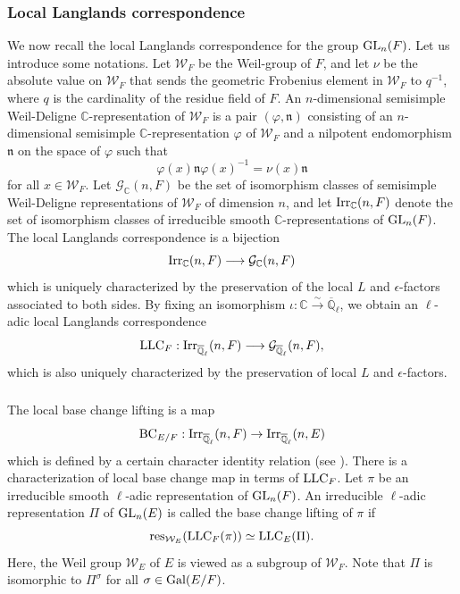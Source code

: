 \documentclass[10pt, reqno]{amsart}
\theoremstyle{plain}
\numberwithin{equation}{section}
\begin{document}
\subsubsection{Local Langlands correspondence}
We now recall the local Langlands correspondence for the group ${\rm GL}_n(F)$. Let us introduce some notations. Let $\mathcal{W}_F$ be the Weil-group of $F$, and let $\nu$ be the absolute value on $\mathcal{W}_F$ that sends the geometric Frobenius element in $\mathcal{W}_F$ to $q^{-1}$, where $q$ is the cardinality of the residue field of $F$. An $n$-dimensional semisimple Weil-Deligne $\mathbb{C}$-representation of $\mathcal{W}_F$ is a pair $(\varphi,\mathfrak{n})$ consisting of an $n$-dimensional semisimple $\mathbb{C}$-representation $\varphi$ of $\mathcal{W}_F$ and a nilpotent endomorphism $\mathfrak{n}$ on the space of $\varphi$ such that 
$$ \varphi(x)\mathfrak{n}\varphi(x)^{-1} = \nu(x)\mathfrak{n} $$
for all $x\in\mathcal{W}_F$. Let $\mathcal{G}_\mathbb{C}(n,F)$ be the set of isomorphism classes of semisimple Weil-Deligne representations of $\mathcal{W}_F$ of dimension $n$, and let ${\rm Irr}_{\mathbb{C}}(n,F)$ denote the set of isomorphism classes of irreducible smooth $\mathbb{C}$-representations of ${\rm GL}_n(F)$. The local Langlands correspondence is a bijection
$$ {\rm Irr}_{\mathbb{C}}(n,F)\longrightarrow \mathcal{G}_{\mathbb{C}}(n,F) $$
which is uniquely characterized by the preservation of the local $L$ and $\epsilon$-factors associated to both sides. By fixing an isomorphism $\iota:\mathbb{C}\xrightarrow{\sim}\overline{\mathbb{Q}}_\ell$, we obtain an $\ell$-adic local Langlands correspondence 
$$ {\rm LLC}_F : {\rm Irr}_{\overline{\mathbb{Q}}_\ell}(n,F)\longrightarrow\mathcal{G}_{\overline{\mathbb{Q}}_\ell}(n,F), $$
which is also uniquely characterized by the preservation of local $L$ and $\epsilon$-factors.
\subsubsection{}
The local base change lifting is a map
$$ {\rm BC}_{E/F}:{\rm Irr}_{\overline{\mathbb{Q}}_\ell}(n,F)\rightarrow {\rm Irr}_{\overline{\mathbb{Q}}_\ell}(n,E) $$
which is defined by a certain character identity relation (see \cite{Arthur_Clozel_BC}). There is a characterization of local base change map in terms of ${\rm LLC}_F$. Let $\pi$ be an irreducible smooth $\ell$-adic representation of ${\rm GL}_n(F)$. An irreducible $\ell$-adic representation $\Pi$ of ${\rm GL}_n(E)$ is called the base change lifting of $\pi$ if 
$$ {\rm res}_{\mathcal{W}_E}({\rm LLC}_F(\pi)) \simeq {\rm LLC}_E(\Pi). $$
Here, the Weil group $\mathcal{W}_E$ of $E$ is viewed as a subgroup of $\mathcal{W}_F$. Note that $\Pi$ is isomorphic to $\Pi^{\sigma}$ for all $\sigma\in {\rm Gal}(E/F)$.
\end{document}
